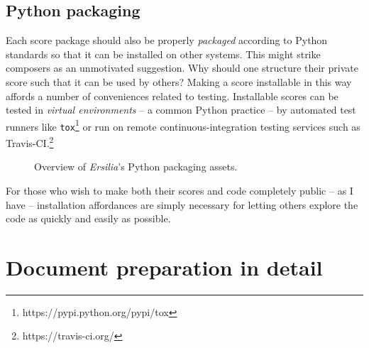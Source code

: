 \subsection{Python packaging}
\label{ssec:python-packaging}

Each score package should also be properly \emph{packaged} according to Python
standards so that it can be installed on other systems. This might strike
composers as an unmotivated suggestion. Why should one structure their private
score such that it can be used by others? Making a score installable in this
way affords a number of conveniences related to testing. Installable scores can
be tested in \emph{virtual environments} -- a common Python practice -- by
automated test runners like
\texttt{tox}\footnote{https://pypi.python.org/pypi/tox} or run on remote
continuous-integration testing services such as
Travis-CI.\footnote{https://travis-ci.org/}

\begin{figure}[h!]
\begin{singlespacing}
\vspace{-0.5\baselineskip}
\end{singlespacing}
\caption{Overview of \emph{Ersilia}'s Python packaging assets.}
\end{figure}

For those who wish to make both their scores and code completely public -- as I
have -- installation affordances are simply necessary for letting others
explore the code as quickly and easily as possible.

\section{Document preparation in detail}
\label{sec:document-preparation-in-detail}

